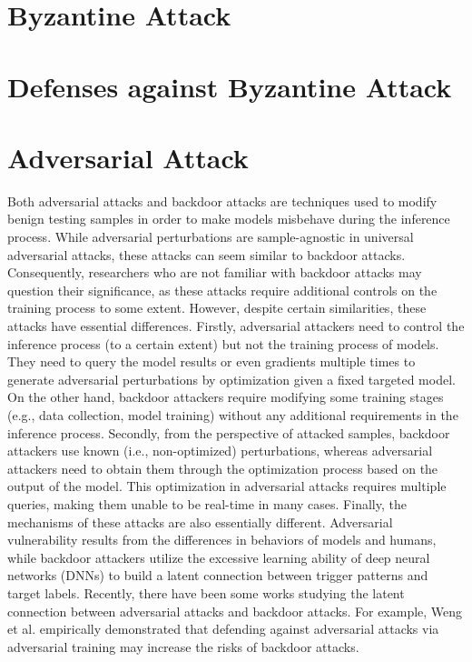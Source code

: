 \documentclass[conference]{IEEEtran}
\begin{document}
\section{Byzantine Attack}
\section{Defenses against Byzantine Attack}
\section{Adversarial Attack}  
Both adversarial attacks and backdoor attacks are techniques used to modify benign 
testing samples in order to make models misbehave during the inference process. 
While adversarial perturbations are sample-agnostic in universal adversarial attacks, 
these attacks can seem similar to backdoor attacks. Consequently, researchers who are 
not familiar with backdoor attacks may question their significance, as these attacks 
require additional controls on the training process to some extent.
However, despite certain similarities, these attacks have essential differences. 
Firstly, adversarial attackers need to control the inference process (to a certain extent) 
but not the training process of models. They need to query the model results or even gradients 
multiple times to generate adversarial perturbations by optimization given a fixed targeted model. 
On the other hand, backdoor attackers require modifying some training stages (e.g., data collection, 
model training) without any additional requirements in the inference process.
Secondly, from the perspective of attacked samples, backdoor attackers use known 
(i.e., non-optimized) perturbations, whereas adversarial attackers need to obtain them through 
the optimization process based on the output of the model. This optimization in adversarial attacks 
requires multiple queries, making them unable to be real-time in many cases.
Finally, the mechanisms of these attacks are also essentially different. 
Adversarial vulnerability results from the differences in behaviors of models and humans, 
while backdoor attackers utilize the excessive learning ability of deep neural networks (DNNs) 
to build a latent connection between trigger patterns and target labels. Recently, 
there have been some works studying the latent connection between adversarial attacks 
and backdoor attacks. For example, Weng et al. \cite{b66}empirically demonstrated that defending 
against adversarial attacks via adversarial training may increase the risks of backdoor attacks.
\end{document}
